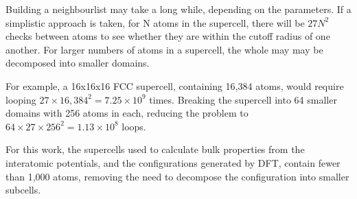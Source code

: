 Building a neighbourlist may take a long while, depending on the parameters.  If a simplistic approach is taken, for N atoms in the supercell, there will be $27N^2$ checks between atoms to see whether they are within the cutoff radius of one another.  For larger numbers of atoms in a supercell, the whole may may be decomposed into smaller domains.

For example, a 16x16x16 FCC supercell, containing 16,384 atoms, would require looping $27 \times 16,384^2 = 7.25 \times 10^9$ times.  Breaking the supercell into 64 smaller domains with 256 atoms in each, reducing the problem to $64 \times 27 \times 256^2 = 1.13 \times 10^8$ loops.

For this work, the supercells used to calculate bulk properties from the interatomic potentials, and the configurations generated by DFT, contain fewer than 1,000 atoms, removing the need to decompose the configuration into smaller subcells.

